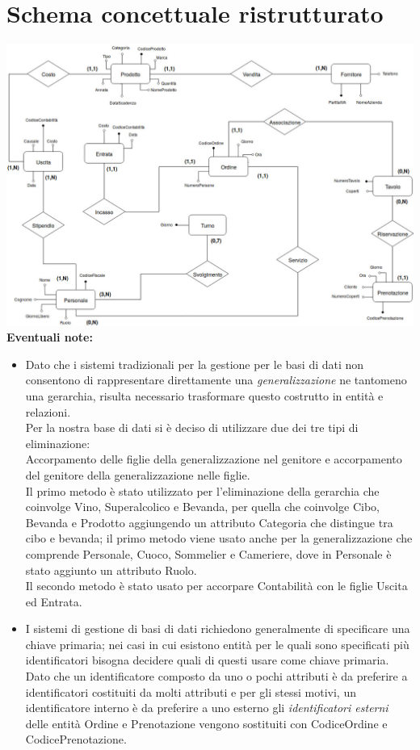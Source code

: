 \section{Schema concettuale ristrutturato}
\includegraphics[width=1\textwidth]{doc/Ristrutturato}
\textbf{Eventuali note:}  
\begin{itemize}
    \item Dato che i sistemi tradizionali per la gestione per le basi di dati non consentono di rappresentare direttamente una \textit{generalizzazione} ne tantomeno una gerarchia, risulta necessario trasformare questo costrutto in entità e relazioni. \\
    Per la nostra base di dati si è deciso di utilizzare due dei tre tipi di eliminazione:\\
    Accorpamento delle figlie della generalizzazione nel genitore e accorpamento del genitore della generalizzazione nelle figlie.\\ 
    Il primo metodo è stato utilizzato per l'eliminazione della gerarchia che coinvolge Vino, Superalcolico e Bevanda, per quella che coinvolge Cibo, Bevanda e Prodotto aggiungendo un attributo Categoria che distingue tra cibo e bevanda; il primo metodo viene usato anche per la generalizzazione che comprende Personale, Cuoco, Sommelier e Cameriere, dove in Personale è stato aggiunto un attributo Ruolo.\\
    Il secondo metodo è stato usato per accorpare Contabilità con le figlie Uscita ed Entrata.
    \item I sistemi di gestione di basi di dati richiedono generalmente di specificare una chiave primaria; nei casi in cui esistono entità per le quali sono specificati più identificatori bisogna decidere quali di questi usare come chiave primaria. \\
    Dato che un identificatore composto da uno o pochi attributi è da preferire a identificatori costituiti da molti attributi e per gli stessi motivi, un identificatore interno è da preferire a uno esterno gli \textit{identificatori esterni} delle entità Ordine e Prenotazione vengono sostituiti con CodiceOrdine e CodicePrenotazione.
\end{itemize}

